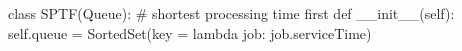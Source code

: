 
  class SPTF(Queue): # shortest processing time first
    def __init__(self):
        self.queue = SortedSet(key = lambda job: job.serviceTime)

